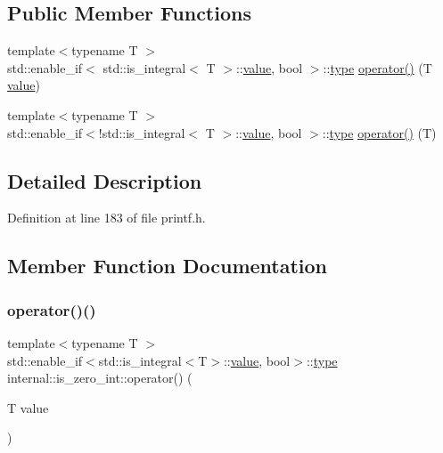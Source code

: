 \subsection*{Public Member Functions}
\begin{DoxyCompactItemize}
\item 
{\footnotesize template$<$typename T $>$ }\\std\+::enable\+\_\+if$<$ std\+::is\+\_\+integral$<$ T $>$\+::\hyperlink{classinternal_1_1value}{value}, bool $>$\+::\hyperlink{namespaceinternal_a8661864098ac0acff9a6dd7e66f59038}{type} \hyperlink{classinternal_1_1is__zero__int_a4dcc6dc1924c41ad05d0c2e6b1fd6c51}{operator()} (T \hyperlink{classinternal_1_1value}{value})
\item 
{\footnotesize template$<$typename T $>$ }\\std\+::enable\+\_\+if$<$!std\+::is\+\_\+integral$<$ T $>$\+::\hyperlink{classinternal_1_1value}{value}, bool $>$\+::\hyperlink{namespaceinternal_a8661864098ac0acff9a6dd7e66f59038}{type} \hyperlink{classinternal_1_1is__zero__int_a9d370073f86c153f883e12fd14284d92}{operator()} (T)
\end{DoxyCompactItemize}


\subsection{Detailed Description}


Definition at line 183 of file printf.\+h.



\subsection{Member Function Documentation}
\mbox{\label{classinternal_1_1is__zero__int_a4dcc6dc1924c41ad05d0c2e6b1fd6c51}} 
\subsubsection{\texorpdfstring{operator()()}{operator()()}\hspace{0.1cm}{\footnotesize\ttfamily [1/2]}}
{\footnotesize\ttfamily template$<$typename T $>$ \\
std\+::enable\+\_\+if$<$std\+::is\+\_\+integral$<$T$>$\+::\hyperlink{classinternal_1_1value}{value}, bool$>$\+::\hyperlink{namespaceinternal_a8661864098ac0acff9a6dd7e66f59038}{type} internal\+::is\+\_\+zero\+\_\+int\+::operator() (\begin{DoxyParamCaption}\item[{T}]{value }\end{DoxyParamCaption})\hspace{0.3cm}{\ttfamily [inline]}}



